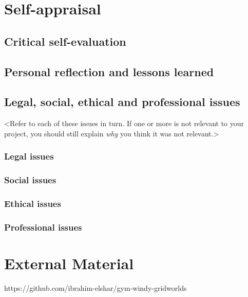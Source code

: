 \begin{appendices}

%
%
\chapter{Self-appraisal}
\section{Critical self-evaluation}

\section{Personal reflection and lessons learned}

\section{Legal, social, ethical and professional issues}

<Refer to each of these issues in turn. If one or more is not relevant to your project, you should still explain {\em why} you think it was not relevant.>

\subsection{Legal issues}

\subsection{Social issues}

\subsection{Ethical issues}

\subsection{Professional issues}


%
%
\chapter{External Material}
https://github.com/ibrahim-elshar/gym-windy-gridworlds


%
%



\end{appendices}
